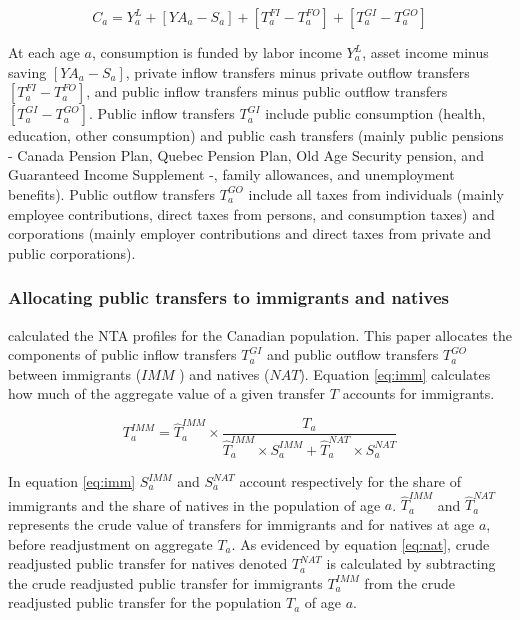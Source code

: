 \begin{equation}\label{eq:1}
  C_a = Y^L_a+[YA_a-S_a]+[T^{FI}_a-T^{FO}_a]+[T^{GI}_a-T^{GO}_a]
\end{equation}

At each age \(a\), consumption is funded by labor  income \(Y^L_a\), asset income minus saving \([YA_a-S_a]\), private inflow transfers minus private outflow transfers \([T^{FI}_a-T^{FO}_a]\), and public inflow transfers minus public outflow transfers \([T^{GI}_a-T^{GO}_a]\).
Public inflow transfers \(T^{GI}_a\) include public consumption (health, education, other consumption) and public cash transfers (mainly public pensions - Canada Pension Plan, Quebec Pension Plan, Old Age Security pension, and Guaranteed Income Supplement -, family allowances, and unemployment benefits).
Public outflow transfers  \(T^{GO}_a\) include all taxes from individuals (mainly employee contributions, direct taxes from persons, and consumption taxes) and corporations (mainly employer contributions and direct taxes from private and public corporations).

\subsubsection*{Allocating public transfers to immigrants and natives}
\citet{merettePopulationAgingCanada2019} calculated the NTA profiles for the Canadian population.
This paper allocates the components of public inflow transfers \(T^{GI}_a\) and public outflow transfers \(T^{GO}_a\) between immigrants (\(IMM\) ) and natives (\(NAT\)).
Equation \eqref{eq:imm} calculates how much of the aggregate value of a given transfer \(T\) accounts for immigrants.

\begin{equation}\label{eq:imm}
 {T}^{IMM}_a = \hat{T}^{IMM}_a \times \frac{{T}_a}{\hat{T}^{IMM}_a \times S^{IMM}_a + \hat{T}^{NAT}_a \times S^{NAT}_a}
\end{equation}

In equation \eqref{eq:imm} \( S^{IMM}_a \) and \( S^{NAT}_a \) account respectively for the share of immigrants and the share of natives in the population of age \(a\). \(\hat{T}^{IMM}_a \) and \( \hat{T}^{NAT}_a\) represents the crude value of transfers for immigrants and for natives at age \(a\), before readjustment on aggregate \({T}_a \).
As evidenced by equation \eqref{eq:nat}, crude readjusted public transfer for natives denoted \({T}^{NAT}_a \) is calculated by subtracting the crude readjusted public transfer for immigrants \({T}^{IMM}_a \) from the crude readjusted public transfer for the population \({T}_a \) of age \(a\).

